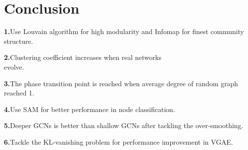 \documentclass[fleqn,10pt]{SelfArx} %
\begin{document}
\section{Conclusion}

\noindent
\textbf{1.}Use Louvain algorithm for high modularity and Infomap for finest community structure.

\noindent
\textbf{2.}Clustering coefficient increases when real networks \\
evolve.

\noindent
\textbf{3.}The phase transition point is reached when average degree of random graph reached 1.

\noindent
\textbf{4.}Use SAM for better performance in node classification.

\noindent
\textbf{5.}Deeper GCNs is better than shallow GCNs after tackling the over-smoothing. 

\noindent 
\textbf{6.}Tackle the KL-vanishing problem for performance improvement in VGAE.




\end{document}
